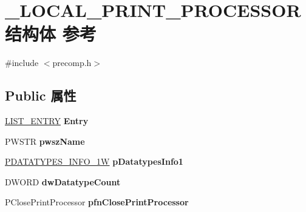\hypertarget{struct___l_o_c_a_l___p_r_i_n_t___p_r_o_c_e_s_s_o_r}{}\section{\+\_\+\+L\+O\+C\+A\+L\+\_\+\+P\+R\+I\+N\+T\+\_\+\+P\+R\+O\+C\+E\+S\+S\+O\+R结构体 参考}
\label{struct___l_o_c_a_l___p_r_i_n_t___p_r_o_c_e_s_s_o_r}


{\ttfamily \#include $<$precomp.\+h$>$}

\subsection*{Public 属性}
\begin{DoxyCompactItemize}
\item 
\mbox{\label{struct___l_o_c_a_l___p_r_i_n_t___p_r_o_c_e_s_s_o_r_a24f54070cce03cdcc55c880c61729f5c}} 
\hyperlink{struct___l_i_s_t___e_n_t_r_y}{L\+I\+S\+T\+\_\+\+E\+N\+T\+RY} {\bfseries Entry}
\item 
\mbox{\label{struct___l_o_c_a_l___p_r_i_n_t___p_r_o_c_e_s_s_o_r_a83184e6942d4690452886874fb37e436}} 
P\+W\+S\+TR {\bfseries pwsz\+Name}
\item 
\mbox{\label{struct___l_o_c_a_l___p_r_i_n_t___p_r_o_c_e_s_s_o_r_afbd99bdd0a8edaafc57fe52149355675}} 
\hyperlink{struct___d_a_t_a_t_y_p_e_s___i_n_f_o__1_w}{P\+D\+A\+T\+A\+T\+Y\+P\+E\+S\+\_\+\+I\+N\+F\+O\+\_\+1W} {\bfseries p\+Datatypes\+Info1}
\item 
\mbox{\label{struct___l_o_c_a_l___p_r_i_n_t___p_r_o_c_e_s_s_o_r_aba26d0d18a9c5a87312fe08118a51417}} 
D\+W\+O\+RD {\bfseries dw\+Datatype\+Count}
\item 
\mbox{\label{struct___l_o_c_a_l___p_r_i_n_t___p_r_o_c_e_s_s_o_r_abd258866b5c98486509095b3bc96a08b}} 
P\+Close\+Print\+Processor {\bfseries pfn\+Close\+Print\+Processor}
\item 
\mbox{\label{struct___l_o_c_a_l___p_r_i_n_t___p_r_o_c_e_s_s_o_r_aa3d06fc67818f769533a7f3b2494f233}} 

\end{DoxyCompactItemize}
